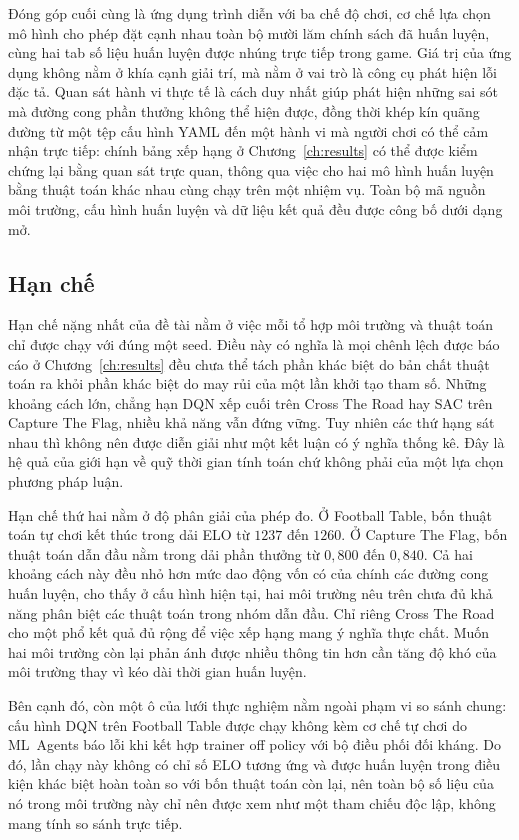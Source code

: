 \indent Đóng góp cuối cùng là ứng dụng trình diễn với ba chế độ chơi, cơ chế lựa chọn mô
hình cho phép đặt cạnh nhau toàn bộ mười lăm chính sách đã huấn luyện, cùng hai tab số
liệu huấn luyện được nhúng trực tiếp trong game. Giá trị của ứng dụng không nằm ở khía
cạnh giải trí, mà nằm ở vai trò là công cụ phát hiện lỗi đặc tả. Quan sát hành vi thực tế
là cách duy nhất giúp phát hiện những sai sót mà đường cong phần thưởng không thể hiện
được, đồng thời khép kín quãng đường từ một tệp cấu hình YAML đến một hành vi mà người
chơi có thể cảm nhận trực tiếp: chính bảng xếp hạng ở Chương~\ref{ch:results} có thể được
kiểm chứng lại bằng quan sát trực quan, thông qua việc cho hai mô hình huấn luyện bằng
thuật toán khác nhau cùng chạy trên một nhiệm vụ. Toàn bộ mã nguồn môi trường, cấu hình
huấn luyện và dữ liệu kết quả đều được công bố dưới dạng mở.

\subsection{Hạn chế}
\label{sub:limits}
\indent Hạn chế nặng nhất của đề tài nằm ở việc mỗi tổ hợp môi trường và thuật toán chỉ
được chạy với đúng một seed. Điều này có nghĩa là mọi chênh lệch được báo
cáo ở Chương~\ref{ch:results} đều chưa thể tách phần khác biệt do bản chất thuật toán ra
khỏi phần khác biệt do may rủi của một lần khởi tạo tham số. Những khoảng cách lớn, chẳng
hạn DQN xếp cuối trên Cross The Road hay SAC trên Capture The Flag, nhiều khả năng
vẫn đứng vững. Tuy nhiên các thứ hạng sát nhau thì không nên được diễn giải như một kết
luận có ý nghĩa thống kê. Đây là hệ quả của giới hạn về quỹ thời gian tính toán chứ không
phải của một lựa chọn phương pháp luận.

\indent Hạn chế thứ hai nằm ở độ phân giải của phép đo. Ở Football Table, bốn thuật toán
tự chơi kết thúc trong dải ELO từ $1237$ đến $1260$. Ở Capture The Flag, bốn thuật toán
dẫn đầu nằm trong dải phần thưởng từ $0{,}800$ đến $0{,}840$. Cả hai khoảng cách này đều
nhỏ hơn mức dao động vốn có của chính các đường cong huấn luyện, cho thấy ở cấu hình hiện
tại, hai môi trường nêu trên chưa đủ khả năng phân biệt các thuật toán trong nhóm dẫn đầu.
Chỉ riêng Cross The Road cho một phổ kết quả đủ rộng để việc xếp hạng mang ý nghĩa thực
chất. Muốn hai môi trường còn lại phản ánh được nhiều thông tin hơn cần tăng độ khó của
môi trường thay vì kéo dài thời gian huấn luyện.

\indent Bên cạnh đó, còn một ô của lưới thực nghiệm nằm ngoài phạm vi so sánh chung: cấu
hình DQN trên Football Table được chạy không kèm cơ chế tự chơi do ML~Agents báo lỗi khi
kết hợp trainer off policy với bộ điều phối đối kháng. Do đó, lần chạy này không có chỉ số
ELO tương ứng và được huấn luyện trong điều kiện khác biệt hoàn toàn so với bốn thuật toán
còn lại, nên toàn bộ số liệu của nó trong môi trường này chỉ nên được xem như một tham
chiếu độc lập, không mang tính so sánh trực tiếp.

